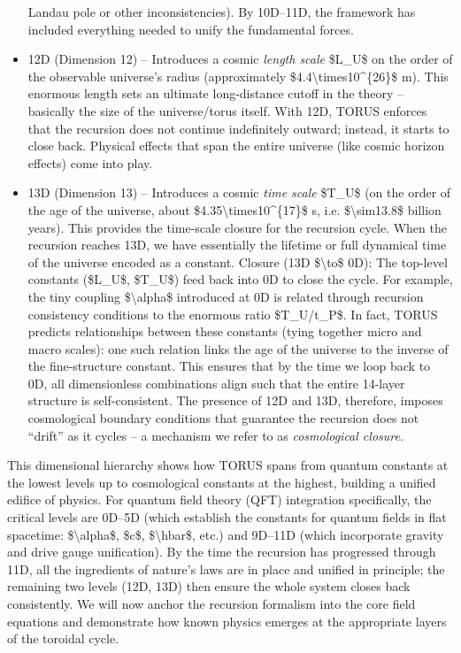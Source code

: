 \documentclass[]{article}
\begin{document}
\begin{itemize}
  Landau pole or other inconsistencies). By 10D--11D, the framework has
  included everything needed to unify the fundamental forces.
\item
  12D (Dimension 12) -- Introduces a cosmic \emph{length scale} \$L\_U\$
  on the order of the observable universe's radius (approximately
  \$4.4\textbackslash{}times10\^{}\{26\}\$ m). This enormous length sets
  an ultimate long-distance cutoff in the theory -- basically the size
  of the universe/torus itself. With 12D, TORUS enforces that the
  recursion does not continue indefinitely outward; instead, it starts
  to close back. Physical effects that span the entire universe (like
  cosmic horizon effects) come into play.
\item
  13D (Dimension 13) -- Introduces a cosmic \emph{time scale} \$T\_U\$
  (on the order of the age of the universe, about
  \$4.35\textbackslash{}times10\^{}\{17\}\$ s, i.e.
  \$\textbackslash{}sim13.8\$ billion years). This provides the
  time-scale closure for the recursion cycle. When the recursion reaches
  13D, we have essentially the lifetime or full dynamical time of the
  universe encoded as a constant. Closure (13D \$\textbackslash{}to\$
  0D): The top-level constants (\$L\_U\$, \$T\_U\$) feed back into 0D to
  close the cycle. For example, the tiny coupling
  \$\textbackslash{}alpha\$ introduced at 0D is related through
  recursion consistency conditions to the enormous ratio \$T\_U/t\_P\$.
  In fact, TORUS predicts relationships between these constants (tying
  together micro and macro scales): one such relation links the age of
  the universe to the inverse of the fine-structure constant. This
  ensures that by the time we loop back to 0D, all dimensionless
  combinations align such that the entire 14-layer structure is
  self-consistent. The presence of 12D and 13D, therefore, imposes
  cosmological boundary conditions that guarantee the recursion does not
  ``drift'' as it cycles -- a mechanism we refer to as
  \emph{cosmological closure}.
\end{itemize}

This dimensional hierarchy shows how TORUS spans from quantum constants
at the lowest levels up to cosmological constants at the highest,
building a unified edifice of physics. For quantum field theory (QFT)
integration specifically, the critical levels are 0D--5D (which
establish the constants for quantum fields in flat spacetime:
\$\textbackslash{}alpha\$, \$c\$, \$\textbackslash{}hbar\$, etc.) and
9D--11D (which incorporate gravity and drive gauge unification). By the
time the recursion has progressed through 11D, all the ingredients of
nature's laws are in place and unified in principle; the remaining two
levels (12D, 13D) then ensure the whole system closes back consistently.
We will now anchor the recursion formalism into the core field equations
and demonstrate how known physics emerges at the appropriate layers of
the toroidal cycle.
\end{document}
